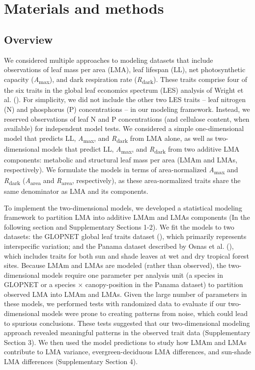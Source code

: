 \documentclass[
  12pt,
  letterpaper,
  DIV=11,
  numbers=noendperiod]{scrartcl}
\begin{document}
\section{Materials and methods}\label{materials-and-methods}

\subsection{Overview}\label{overview}

We considered multiple approaches to modeling datasets that include
observations of leaf mass per area (LMA), leaf lifespan (LL), net
photosynthetic capacity (\emph{A}\textsubscript{max}), and dark
respiration rate (\emph{R}\textsubscript{dark}). These traits comprise
four of the six traits in the global leaf economics spectrum (LES)
analysis of Wright et al. (). For
simplicity, we did not include the other two LES traits -- leaf nitrogen
(N) and phosphorus (P) concentrations -- in our modeling framework.
Instead, we reserved observations of leaf N and P concentrations (and
cellulose content, when available) for independent model tests. We
considered a simple one-dimensional model that predicts LL,
\emph{A}\textsubscript{max}, and \emph{R}\textsubscript{dark} from LMA
alone, as well as two-dimensional models that predict LL,
\emph{A}\textsubscript{max}, and \emph{R}\textsubscript{dark} from two
additive LMA components: metabolic and structural leaf mass per area
(LMAm and LMAs, respectively). We formulate the models in terms of
area-normalized \emph{A}\textsubscript{max} and
\emph{R}\textsubscript{dark} (\emph{A}\textsubscript{area} and
\emph{R}\textsubscript{area}, respectively), as these area-normalized
traits share the same denominator as LMA and its components.

To implement the two-dimensional models, we developed a statistical
modeling framework to partition LMA into additive LMAm and LMAs
components (In the following section and Supplementary Sections 1-2). We
fit the models to two datasets: the GLOPNET global leaf traits dataset
(), which primarily
represents interspecific variation; and the Panama dataset described by
Osnas et al. (), which includes traits for
both sun and shade leaves at wet and dry tropical forest sites. Because
LMAm and LMAs are modeled (rather than observed), the two-dimensional
models require one parameter per analysis unit (a species in GLOPNET or
a species \(\times\) canopy-position in the Panama dataset) to partition
observed LMA into LMAm and LMAs. Given the large number of parameters in
these models, we performed tests with randomized data to evaluate if our
two-dimensional models were prone to creating patterns from noise, which
could lead to spurious conclusions. These tests suggested that our
two-dimensional modeling approach revealed meaningful patterns in the
observed trait data (Supplementary Section 3). We then used the model
predictions to study how LMAm and LMAs contribute to LMA variance,
evergreen-deciduous LMA differences, and sun-shade LMA differences
(Supplementary Section 4).
\end{document}
